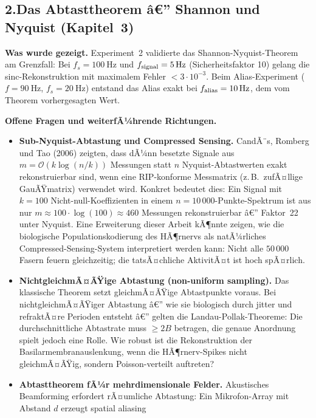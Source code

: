 ﻿\documentclass[12pt,a4paper,titlepage]{report}
\begin{document}
\subsection*{2.\enspace Das Abtasttheorem â€” Shannon und Nyquist
(Kapitel~3)}

\textbf{Was wurde gezeigt.}
Experiment~2 validierte das Shannon-Nyquist-Theorem am Grenzfall:
Bei $f_s=\SI{100}{\hertz}$ und $f_{\rm signal}=\SI{5}{\hertz}$
(Sicherheitsfaktor 10) gelang die sinc-Rekonstruktion mit
maximalem Fehler $< 3\cdot 10^{-3}$.
Beim Alias-Experiment ($f=\SI{90}{\hertz}$, $f_s=\SI{20}{\hertz}$)
entstand das Alias exakt bei $f_{\rm alias}=\SI{10}{\hertz}$,
dem vom Theorem vorhergesagten Wert.

\textbf{Offene Fragen und weiterfÃ¼hrende Richtungen.}
\begin{itemize}[leftmargin=2em]
  \item \textbf{Sub-Nyquist-Abtastung und Compressed Sensing.}
    CandÃ¨s, Romberg und Tao (2006) zeigten, dass dÃ¼nn besetzte Signale
    aus $m=\mathcal{O}(k\log(n/k))$ Messungen statt $n$ Nyquist-Abtastwerten
    exakt rekonstruierbar sind, wenn eine RIP-konforme Messmatrix
    (z.\,B.\ zufÃ¤llige GauÃŸmatrix) verwendet wird.
    Konkret bedeutet dies: Ein Signal mit $k=100$ Nicht-null-Koeffizienten
    in einem $n=10\,000$-Punkte-Spektrum ist aus nur
    $m\approx100\cdot\log(100)\approx 460$ Messungen rekonstruierbar â€”
    Faktor~22 unter Nyquist.
    Eine Erweiterung dieser Arbeit kÃ¶nnte zeigen, wie die biologische
    Populationskodierung des HÃ¶rnervs als natÃ¼rliches Compressed-Sensing-System
    interpretiert werden kann:
    Nicht alle $50\,000$ Fasern feuern gleichzeitig; die tatsÃ¤chliche
    AktivitÃ¤t ist hoch spÃ¤rlich.
  \item \textbf{NichtgleichmÃ¤ÃŸige Abtastung (non-uniform sampling).}
    Das klassische Theorem setzt gleichmÃ¤ÃŸige Abtastpunkte voraus.
    Bei nichtgleichmÃ¤ÃŸiger Abtastung â€” wie sie biologisch durch
    jitter und refraktÃ¤re Perioden entsteht â€” gelten die
    Landau-Pollak-Theoreme:
    Die durchschnittliche Abtastrate muss $\geq 2B$ betragen,
    die genaue Anordnung spielt jedoch eine Rolle.
    Wie robust ist die Rekonstruktion der Basilarmembranauslenkung,
    wenn die HÃ¶rnerv-Spikes nicht gleichmÃ¤ÃŸig, sondern Poisson-verteilt auftreten?
  \item \textbf{Abtasttheorem fÃ¼r mehrdimensionale Felder.}
    Akustisches Beamforming erfordert rÃ¤umliche Abtastung:
    Ein Mikrofon-Array mit Abstand $d$ erzeugt spatial aliasing

\end{itemize}
\end{document}
